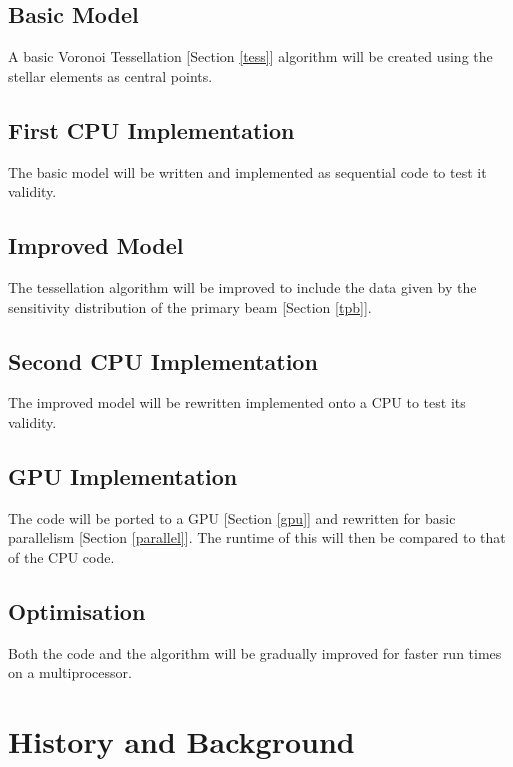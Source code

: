 \documentclass{article}
\begin{document}
\subsection{Basic Model}
A basic Voronoi Tessellation [Section \ref{tess}] algorithm will be created using the stellar elements as central points.
\subsection{First CPU Implementation}
The basic model will be written and implemented as sequential code to test it validity.
\subsection{Improved Model}
The tessellation algorithm will be improved to include the data given by the sensitivity distribution of the primary beam [Section \ref{tpb}].
\subsection{Second CPU Implementation}
The improved model will be rewritten implemented onto a CPU to test its validity.
\subsection{GPU Implementation}
The code will be ported to a GPU [Section \ref{gpu}] and rewritten for basic parallelism [Section \ref{parallel}]. The runtime of this will then be compared to that of the CPU code.
\subsection{Optimisation}
Both the code and the algorithm will be gradually improved for faster run times on a multiprocessor.
\newpage
\section{History and Background}
\end{document}
